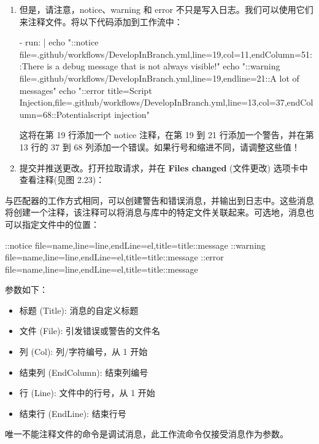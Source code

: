 \begin{enumerate}
\item 
但是，请注意，notice、warning 和 error 不只是写入日志。我们可以使用它们来注释文件。将以下代码添加到工作流中：

\begin{shell}
- run: |
  echo "::notice file=.github/workflows/DevelopInBranch.yml,line=19,col=11,endColumn=51::There is a debug message that is not always visible!"
  echo "::warning file=.github/workflows/DevelopInBranch.yml,line=19,endline=21::A lot of messages"
  echo "::error title=Script Injection,file=.github/workflows/DevelopInBranch.yml,line=13,col=37,endColumn=68::Potentialscript injection"
\end{shell}

这将在第 19 行添加一个 notice 注释，在第 19 到 21 行添加一个警告，并在第 13 行的 37 到 68 列添加一个错误。如果行号和缩进不同，请调整这些值！

\item 
提交并推送更改。打开拉取请求，并在 \textbf{Files changed }(文件更改) 选项卡中查看注释(见图 2.23)：

\end{enumerate}


与匹配器的工作方式相同，可以创建警告和错误消息，并输出到日志中。这些消息将创建一个注释，该注释可以将消息与库中的特定文件关联起来。可选地，消息也可以指定文件中的位置：

\begin{shell}
::notice file={name},line={line},endLine={el},title={title}::{message}
::warning
file={name},line={line},endLine={el},title={title}::{message}
::error file={name},line={line},endLine={el},title={title}::{message}
\end{shell}

参数如下：

\begin{itemize}
\item 
标题 (Title): 消息的自定义标题

\item 
文件 (File): 引发错误或警告的文件名

\item 
列 (Col): 列/字符编号，从 1 开始

\item 
结束列 (EndColumn): 结束列编号

\item 
行 (Line): 文件中的行号，从 1 开始

\item 
结束行 (EndLine): 结束行号
\end{itemize}

唯一不能注释文件的命令是调试消息，此工作流命令仅接受消息作为参数。
